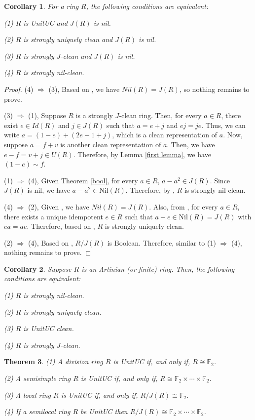 \documentclass[12pt]{amsart}
\newtheorem{theorem}{Theorem}[section]
\newtheorem{corollary}[theorem]{Corollary}
\theoremstyle{definition}
\begin{document}
\begin{corollary}\label{nil}
For a ring $R$, the following conditions are equivalent:

(1)  $R$ is   UnitUC and $J(R)$ is nil.

(2) $R$ is strongly uniquely clean and $J(R)$ is nil.

(3) $R$ is strongly $J$-clean and $J(R)$ is nil.

(4) $R$ is strongly nil-clean.
\end{corollary}
\begin{proof}
(4) $\Rightarrow$ (3), Based on \cite[Theorem 5.1.5]{chenbo}, we have $Nil(R) = J(R)$, so nothing remains to prove.

(3) $\Rightarrow$ (1), Suppose $R$ is a strongly $J$-clean ring. Then, for every $a \in R$, there exist $e \in Id(R)$ and $j \in J(R)$ such that $a = e + j$ and $ej = je$. Thus, we can write $a = (1 - e) + (2e - 1 + j)$, which is a clean representation of $a$. Now, suppose $a = f + v$ is another clean representation of $a$. Then, we have $e - f = v + j \in U(R)$. Therefore, by Lemma \ref{first lemma}, we have $(1 - e) \sim f$.

(1) $\Rightarrow$ (4), Given Theorem \ref{bool}, for every $a \in R$, $a-a^2 \in J(R)$. Since $J(R)$ is nil, we have $a-a^2 \in \text{Nil}(R)$. Therefore, by \cite[Theorem 5.1.1]{chenbo}, $R$ is strongly nil-clean.

(4) $\Rightarrow$ (2), Given \cite[Theorem 5.1.5]{chenbo}, we have $Nil(R) = J(R)$. Also, from \cite[Corollary 5.1.2]{chenbo}, for every $a \in R$, there exists a unique idempotent $e \in R$ such that $a-e \in \text{Nil}(R) = J(R)$ with $ea = ae$. Therefore, based on \cite[Theorem 17]{USC}, $R$ is strongly uniquely clean.

(2) $\Rightarrow$ (4), Based on \cite[Corollary 18]{USC}, $R/J(R)$ is Boolean. Therefore, similar to (1) $\Rightarrow$ (4), nothing remains to prove.
\end{proof}

\begin{corollary}
Suppose $R$ is an Artinian (or finite) ring. Then, the following conditions are equivalent:

(1) $R$ is strongly nil-clean. 

(2) $R$ is strongly uniquely clean.

(3) $R$ is   UnitUC clean. 

(4) $R$ is strongly $J$-clean.

\end{corollary}
\begin{theorem}\label{division}
(1) A division ring $R$ is   UnitUC  if, and only if, $R \cong \mathbb{F}_2$.

(2) A semisimple ring $R$ is  UnitUC if, and only if, $R \cong \mathbb{F}_2 \times \cdots \times \mathbb{F}_2$.

(3) A local ring $R$ is   UnitUC if, and only if, $R/J(R) \cong \mathbb{F}_2$.

(4) If a semilocal ring $R$ be   UnitUC then $R/J(R) \cong \mathbb{F}_2 \times \cdots \times \mathbb{F}_2$.
\end{theorem}
\end{document}
